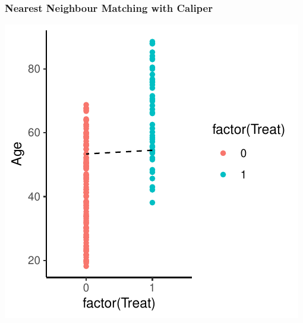 \documentclass[xcolor=x11names,compress]{beamer}\usepackage[]{graphicx}\usepackage[]{color}
\makeatletter
\def\maxwidth{ %
  \ifdim\Gin@nat@width>\linewidth
    \linewidth
  \else
    \Gin@nat@width
  \fi
}
\newenvironment{knitrout}{}{} %
\renewcommand{\(}{\begin{columns}}
\renewcommand{\)}{\end{columns}}
\newcommand{\<}[1]{\begin{column}{#1}}
\renewcommand{\>}{\end{column}}
\makeatother
\begin{document}
\begin{frame}
\frametitle{Nearest Neighbour Matching with Caliper}
\begin{center}
\begin{knitrout}
\color{fgcolor}
\includegraphics[width=\maxwidth]{figure/nearest_matching_2_pre_caliper-1} 

\end{knitrout}
\end{center}
\end{frame}
\end{document}

